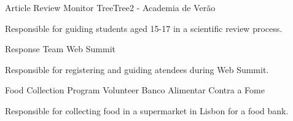 

\begin{cventries}
  \cventryshort
    {Article Review Monitor} %
    {TreeTree2 - Academia de Verão} %
    {} %
    {} %
    {
      \begin{cvitems} %
        \item {Responsible for guiding students aged 15-17 in a scientific review process.}
      \end{cvitems} 
    }
    
  \cventryshort
    {Response Team} %
    {Web Summit} %
    {} %
    {} %
    {
      \begin{cvitems} %
        \item {Responsible for registering and guiding atendees during Web Summit.}
      \end{cvitems} 
    }

  \cventryshort
    {Food Collection Program Volunteer} %
    {Banco Alimentar Contra a Fome} %
    {} %
    {} %
    {
      \begin{cvitems} %
        \item {Responsible for collecting food in a supermarket in Lisbon for a food bank.}
      \end{cvitems} 
    }

\end{cventries}
